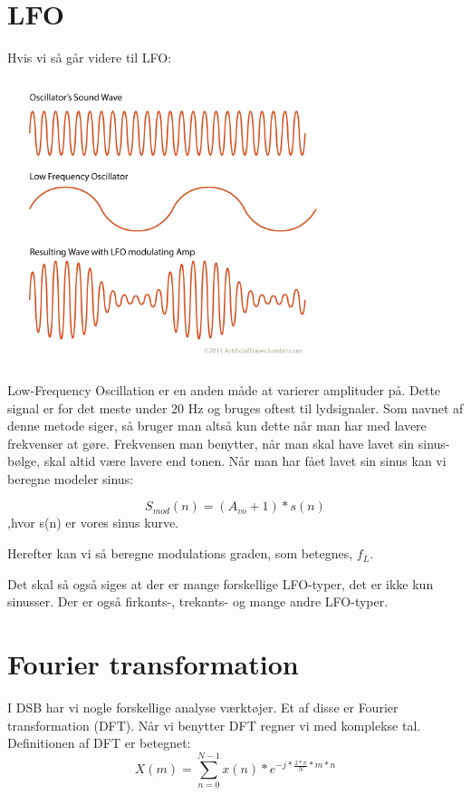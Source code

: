 \documentclass[12pt, letterpaper]{article}
\begin{document}
\section{LFO}

Hvis vi så går videre til LFO: 

\begin{center}
\includegraphics[width=0.7\textwidth]{billeder/LFO}
\end{center}

Low-Frequency Oscillation er en anden måde at varierer amplituder på. 
Dette signal er for det meste under 20 Hz og bruges oftest til lydsignaler. Som navnet af denne metode siger, så bruger man altså kun dette når man har med lavere frekvenser at gøre. Frekvensen man benytter, når man skal have lavet sin sinus-bølge, skal altid være lavere end tonen. 
Når man har fået lavet sin sinus kan vi beregne modeler sinus: 

$$S_{mod} (n) = (A_{vo} + 1)*s(n)$$
,hvor s(n) er vores sinus kurve. 

Herefter kan vi så beregne modulations graden, som betegnes, $f_L$.

Det skal så også siges at der er mange forskellige LFO-typer, det er ikke kun sinusser. Der er også firkants-, trekants-  og mange andre LFO-typer. 


\section{Fourier transformation}

I DSB har vi nogle forskellige analyse værktøjer. Et af disse er Fourier transformation (DFT). Når vi benytter DFT regner vi med komplekse tal. 
Definitionen af DFT er betegnet: 
$$X(m)= \sum\limits_{n=0}^{N-1} x(n)*e^{-j*\frac{2*\pi}{N}*m*n}$$
\end{document}
